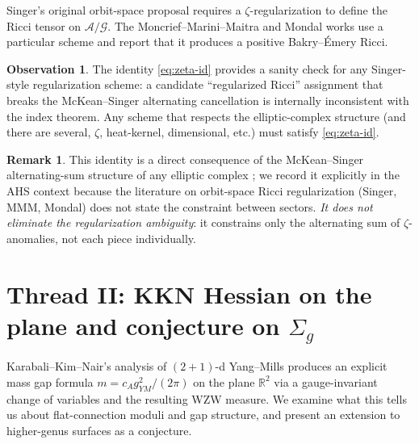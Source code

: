 \documentclass[11pt,letterpaper]{article}
\theoremstyle{definition}
\newtheorem{remark}[theorem]{Remark}
\newtheorem{observation}[theorem]{Observation}
\newcommand{\bbR}{\mathbb{R}}
\newcommand{\cA}{\mathcal{A}}
\newcommand{\cG}{\mathcal{G}}
\begin{document}
Singer's original orbit-space proposal \cite{Singer1981} requires a $\zeta$-regularization to define the Ricci tensor on $\cA/\cG$. The Moncrief--Marini--Maitra and Mondal works \cite{MMM2019,Mondal2023} use a particular scheme and report that it produces a positive Bakry--\'Emery Ricci.

\begin{observation}\label{obs:scheme-constraint}
The identity \eqref{eq:zeta-id} provides a sanity check for any Singer-style regularization scheme: a candidate ``regularized Ricci'' assignment that breaks the McKean--Singer alternating cancellation is internally inconsistent with the index theorem. Any scheme that respects the elliptic-complex structure (and there are several, $\zeta$, heat-kernel, dimensional, etc.) must satisfy \eqref{eq:zeta-id}.
\end{observation}

\begin{remark}
This identity is a direct consequence of the McKean--Singer alternating-sum structure of any elliptic complex \cite{Gilkey1995}; we record it explicitly in the AHS context because the literature on orbit-space Ricci regularization (Singer, MMM, Mondal) does not state the constraint between sectors. \emph{It does not eliminate the regularization ambiguity}: it constrains only the alternating sum of $\zeta$-anomalies, not each piece individually.
\end{remark}

\section{Thread II: KKN Hessian on the plane and conjecture on $\Sigma_g$}\label{sec:KKN}

Karabali--Kim--Nair's analysis of $(2{+}1)$-d Yang--Mills produces an explicit mass gap formula $m = c_A g^2_{YM}/(2\pi)$ on the plane $\bbR^2$ via a gauge-invariant change of variables and the resulting WZW measure. We examine what this tells us about flat-connection moduli and gap structure, and present an extension to higher-genus surfaces as a conjecture.
\end{document}
